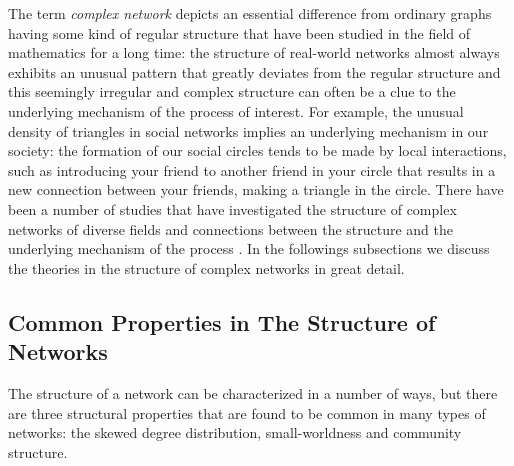 	The term \textit{complex network} depicts an essential difference from ordinary graphs having some kind of regular structure that have been studied in the field of mathematics for a long time: the structure of real-world networks almost always exhibits an unusual pattern that greatly deviates from the regular structure and this seemingly irregular and complex structure can often be a clue to the underlying mechanism of the process of interest.  For example, the unusual density of triangles in social networks implies an underlying mechanism in our society: the formation of our social circles tends to be made by local interactions, such as introducing your friend to another friend in your circle that results in a new connection between your friends, making a triangle in the circle. There have been a number of studies that have investigated the structure of complex networks of diverse fields and connections between the structure and the underlying mechanism of the process \cite{Strogatz2001, Newman03thestructure, StatisticalMechanics, boccaletti06}. In the followings subsections we discuss the theories in the structure of complex networks in great detail.
	
	\subsection{Common Properties in The Structure of Networks}
	The structure of a network can be characterized in a number of ways, but there are three structural properties that are found to be common in many types of networks: the skewed degree distribution, small-worldness and community structure.
	
